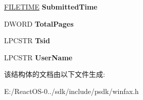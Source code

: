 \begin{DoxyCompactItemize}
\hyperlink{struct___f_i_l_e_t_i_m_e}{F\+I\+L\+E\+T\+I\+ME} {\bfseries Submitted\+Time}
\item 
\mbox{\label{struct___f_a_x___d_e_v_i_c_e___s_t_a_t_u_s_a_a37166f5ac0b10c5d223d25e21b4c3e34}} 
D\+W\+O\+RD {\bfseries Total\+Pages}
\item 
\mbox{\label{struct___f_a_x___d_e_v_i_c_e___s_t_a_t_u_s_a_a21d5dc968bc34cdc400e58818b7af4ab}} 
L\+P\+C\+S\+TR {\bfseries Tsid}
\item 
\mbox{\label{struct___f_a_x___d_e_v_i_c_e___s_t_a_t_u_s_a_a0be49c2bf343368952b96df3ff703f16}} 
L\+P\+C\+S\+TR {\bfseries User\+Name}
\end{DoxyCompactItemize}


该结构体的文档由以下文件生成\+:\begin{DoxyCompactItemize}
\item 
E\+:/\+React\+O\+S-\/0../sdk/include/psdk/winfax.\+h\end{DoxyCompactItemize}
